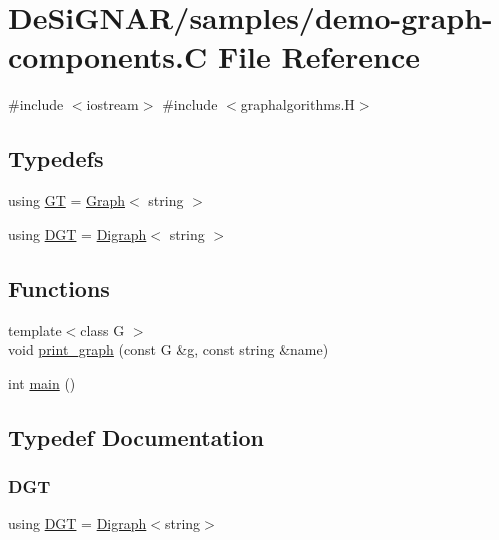 \hypertarget{demo-graph-components_8_c}{}\section{De\+Si\+G\+N\+A\+R/samples/demo-\/graph-\/components.C File Reference}
\label{demo-graph-components_8_c}
{\ttfamily \#include $<$iostream$>$}\newline
{\ttfamily \#include $<$graphalgorithms.\+H$>$}\newline
\subsection*{Typedefs}
\begin{DoxyCompactItemize}
\item 
using \hyperlink{demo-graph-components_8_c_a668102de43ec3f9488fff7b515d48859}{GT} = \hyperlink{class_designar_1_1_graph}{Graph}$<$ string $>$
\item 
using \hyperlink{demo-graph-components_8_c_a8f123599e859454680bf37e203c0b18b}{D\+GT} = \hyperlink{class_designar_1_1_digraph}{Digraph}$<$ string $>$
\end{DoxyCompactItemize}
\subsection*{Functions}
\begin{DoxyCompactItemize}
\item 
{\footnotesize template$<$class G $>$ }\\void \hyperlink{demo-graph-components_8_c_af4aa6ad85cbef3cd03726e2b31004df6}{print\+\_\+graph} (const G \&g, const string \&name)
\item 
int \hyperlink{demo-graph-components_8_c_ae66f6b31b5ad750f1fe042a706a4e3d4}{main} ()
\end{DoxyCompactItemize}


\subsection{Typedef Documentation}
\mbox{\label{demo-graph-components_8_c_a8f123599e859454680bf37e203c0b18b}} 
\subsubsection{\texorpdfstring{D\+GT}{DGT}}
{\footnotesize\ttfamily using \hyperlink{demo-buildgraph_8_c_ae73e956c2a8cf0a58255aa6b659985e0}{D\+GT} =  \hyperlink{class_designar_1_1_digraph}{Digraph}$<$string$>$}



